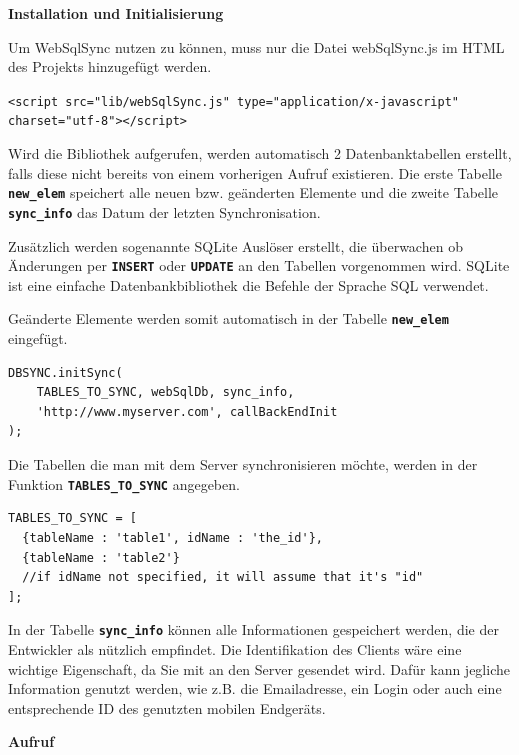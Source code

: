 \cleardoublepage

\textbf{Installation und Initialisierung}

Um WebSqlSync nutzen zu können, muss nur die Datei webSqlSync.js im \ac{HTML} des Projekts hinzugefügt werden.

\lstset{language=html}
\lstinline$<script src="lib/webSqlSync.js" type="application/x-javascript" charset="utf-8"></script>$

Wird die Bibliothek aufgerufen, werden automatisch 2 Datenbanktabellen erstellt, falls diese nicht bereits von einem vorherigen Aufruf existieren. Die erste Tabelle \textbf{\lstinline$new_elem$} speichert alle neuen bzw. geänderten Elemente und die zweite Tabelle \textbf{\lstinline$sync_info$} das Datum der letzten Synchronisation.

Zusätzlich werden sogenannte SQLite Auslöser erstellt, die überwachen ob Änderungen per \textbf{\lstinline$INSERT$} oder \textbf{\lstinline$UPDATE$} an den Tabellen vorgenommen wird. SQLite ist eine einfache Datenbankbibliothek die Befehle der Sprache \ac{SQL} verwendet.

Geänderte Elemente werden somit automatisch in der Tabelle \textbf{\lstinline$new_elem$} eingefügt.

\lstset{language=html}
\begin{lstlisting}
DBSYNC.initSync(
	TABLES_TO_SYNC, webSqlDb, sync_info,
	'http://www.myserver.com', callBackEndInit
);
\end{lstlisting}

Die Tabellen die man mit dem Server synchronisieren möchte, werden in der Funktion \textbf{\lstinline$TABLES_TO_SYNC$} angegeben.

\lstset{language=html}
\begin{lstlisting}
TABLES_TO_SYNC = [
  {tableName : 'table1', idName : 'the_id'},
  {tableName : 'table2'}
  //if idName not specified, it will assume that it's "id"
];
\end{lstlisting}

In der Tabelle \textbf{\lstinline$sync_info$} können alle Informationen gespeichert werden, die der Entwickler als nützlich empfindet. Die Identifikation des Clients wäre eine wichtige Eigenschaft, da Sie mit an den Server gesendet wird. Dafür kann jegliche Information genutzt werden, wie z.B. die Emailadresse, ein Login oder auch eine entsprechende \ac{ID} des genutzten mobilen Endgeräts.

\cleardoublepage

\textbf{Aufruf}

